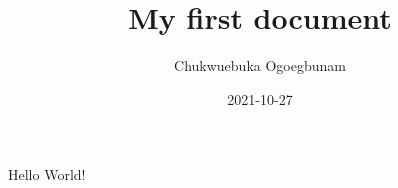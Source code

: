 \documentclass{article}
\title{My first document}
\date{2021-10-27}
\author{Chukwuebuka Ogoegbunam}
\begin{document}
	\maketitle
	\newpage
	Hello World!
\end{document}
